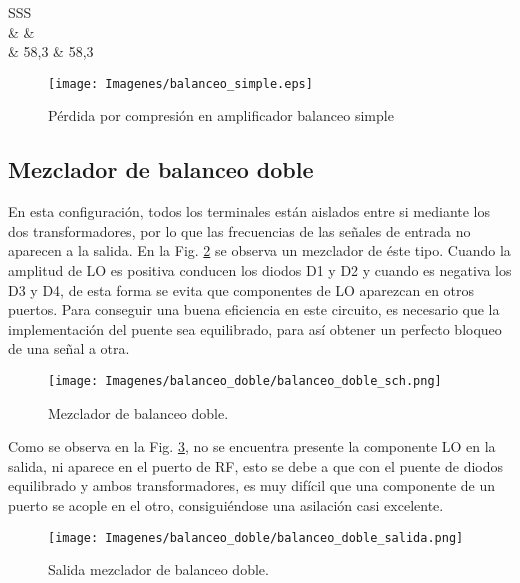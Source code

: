 \documentclass[conference]{IEEEtran}
\begin{document}
\begin{table}[h!]
  \begin{tabular}{SSS}
    \toprule
      \\
      \midrule
      & &\\
        & 58,3 & 58,3 \\
    \bottomrule
  \end{tabular}
  \caption{Valores Balanceo Simple}
  \label{tablaBalanceoSimple_conversion}
\end{table}

			\begin{figure}[h!]
			\centering
			\texttt{[image: Imagenes/balanceo\_simple.eps]} 
			\caption{Pérdida por compresión en amplificador balanceo simple }
			\label{balanceoSimple_compresion}
			\end{figure}



\subsection{Mezclador de balanceo doble}

En esta configuración, todos los terminales están aislados entre si mediante los dos transformadores, por lo que las frecuencias de las señales de entrada no aparecen a la salida. En la Fig. \ref{balanceoDoble_sch} se observa un mezclador de éste tipo. Cuando la amplitud de LO es positiva conducen los diodos D1 y D2 y cuando es negativa los D3 y D4, de esta forma se evita que componentes de LO aparezcan en otros puertos. Para conseguir una buena eficiencia en este circuito, es necesario que la implementación del puente sea equilibrado, para así obtener un perfecto bloqueo de una señal a otra. 

			\begin{figure}[h!]
			\centering
			\texttt{[image: Imagenes/balanceo\_doble/balanceo\_doble\_sch.png]} 
			\caption{Mezclador de balanceo doble.}
			\label{balanceoDoble_sch}
			\end{figure}


			
			
Como se observa en la Fig. \ref{balanceoDoble_salida}, no se encuentra presente la componente LO en la salida, ni aparece en el puerto de RF, esto se debe a que con el puente de diodos equilibrado y ambos transformadores, es muy difícil que una componente de un puerto se acople en el otro, consiguiéndose una asilación casi excelente.
			\begin{figure}[h!]
			\centering
			\texttt{[image: Imagenes/balanceo\_doble/balanceo\_doble\_salida.png]} 
			\caption{Salida mezclador de balanceo doble.}
			\label{balanceoDoble_salida}
			\end{figure}
\end{document}
